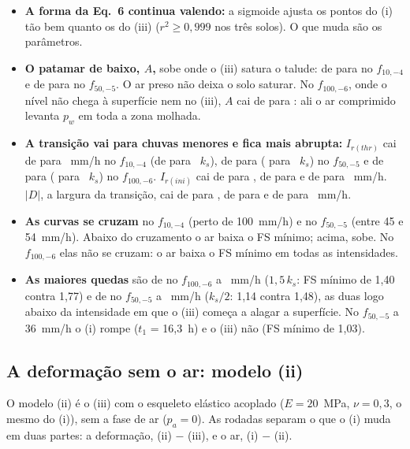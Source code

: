 \documentclass[11pt,a4paper]{article}
\begin{document}
\begin{itemize}
  \item \textbf{A forma da Eq.~6 continua valendo:} a sigmoide ajusta os pontos do (i) tão bem quanto os do (iii)
    ($r^2 \ge 0{,}999$ nos três solos). O que muda são os parâmetros.
  \item \textbf{O patamar de baixo, $A$,} sobe onde o (iii) satura o talude: de \ATresDez{} para \AUmDez{} no
    $f_{10,-4}$ e de \ATresCinq{} para \AUmCinq{} no $f_{50,-5}$. O ar preso não deixa o solo saturar. No $f_{100,-6}$,
    onde o nível não chega à superfície nem no (iii), $A$ cai de \ATresCem{} para \AUmCem: ali o ar comprimido levanta
    $p_w$ em toda a zona molhada.
  \item \textbf{A transição vai para chuvas menores e fica mais abrupta:} $I_{r(thr)}$ cai de \ThrTresDez{} para
    \ThrUmDez~mm/h no $f_{10,-4}$ (de \ThrksTresDez{} para \ThrksUmDez~$k_s$), de \ThrTresCinq{} para \ThrUmCinq{}
    (\ThrksTresCinq{} para \ThrksUmCinq~$k_s$) no $f_{50,-5}$ e de \ThrTresCem{} para \ThrUmCem{} (\ThrksTresCem{} para
    \ThrksUmCem~$k_s$) no $f_{100,-6}$. $I_{r(ini)}$ cai de \IniTresDez{} para \IniUmDez, de \IniTresCinq{} para
    \IniUmCinq{} e de \IniTresCem{} para \IniUmCem~mm/h. $|D|$, a largura da transição, cai de \DTresDez{} para
    \DUmDez, de \DTresCinq{} para \DUmCinq{} e de \DTresCem{} para \DUmCem~mm/h.
  \item \textbf{As curvas se cruzam} no $f_{10,-4}$ (perto de 100~mm/h) e no $f_{50,-5}$ (entre 45 e 54~mm/h). Abaixo
    do cruzamento o ar baixa o FS mínimo; acima, sobe. No $f_{100,-6}$ elas não se cruzam: o ar baixa o FS mínimo em
    todas as intensidades.
  \item \textbf{As maiores quedas} são de \quedaCem{} no $f_{100,-6}$ a \quedaCemI~mm/h ($1{,}5\,k_s$: FS mínimo de
    1,40 contra 1,77) e de \quedaCinq{} no $f_{50,-5}$ a \quedaCinqI~mm/h ($k_s/2$: 1,14 contra 1,48), as duas logo
    abaixo da intensidade em que o (iii) começa a alagar a superfície. No $f_{50,-5}$ a 36~mm/h o (i) rompe ($t_1$ =
    16,3~h) e o (iii) não (FS mínimo de 1,03).
\end{itemize}

\subsection{A deformação sem o ar: modelo (ii)}\label{sec:modeloii}
O modelo (ii) é o (iii) com o esqueleto elástico acoplado ($E = 20$~MPa, $\nu = 0{,}3$, o mesmo do (i)), sem a fase de
ar ($p_a = 0$). As \iiFeitos{} rodadas separam o que o (i) muda em duas partes: a deformação, (ii) $-$ (iii), e o ar,
(i) $-$ (ii).
\end{document}
